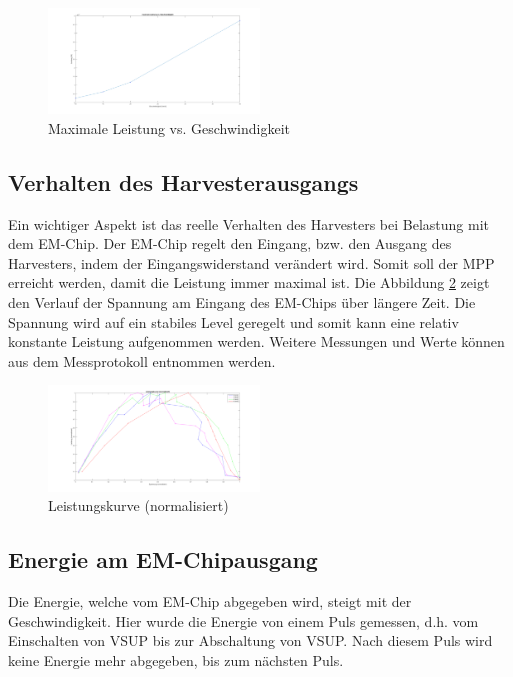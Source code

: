 \begin{figure}[ht]
    \includegraphics[width=0.5\textwidth]{4Resultate/imag/ResultatLeistungGeschwindigkeit.png} 
    \caption{Maximale Leistung vs. Geschwindigkeit}
    \label{mpp_resultat_harvester}
\end{figure}

\subsection{Verhalten des Harvesterausgangs}
Ein wichtiger Aspekt ist das reelle Verhalten des Harvesters bei Belastung mit dem EM-Chip. Der EM-Chip regelt den Eingang, bzw. den Ausgang des Harvesters, indem der Eingangswiderstand verändert wird. Somit soll der MPP erreicht werden, damit die Leistung immer maximal ist. Die Abbildung \ref{resultat_Harvester_Spannung} zeigt den Verlauf der Spannung am Eingang des EM-Chips über längere Zeit. Die Spannung wird auf ein stabiles Level geregelt und somit kann eine relativ konstante Leistung aufgenommen werden. Weitere Messungen und Werte können aus dem Messprotokoll  entnommen werden.

\begin{figure}[ht]
    \includegraphics[width=0.5\textwidth]{4Resultate/imag/MPPHarvester.png} 
    \caption{Leistungskurve (normalisiert) }
    \label{resultat_Harvester_Spannung}
\end{figure}


\subsection{Energie am EM-Chipausgang}

Die Energie, welche vom EM-Chip abgegeben wird, steigt mit der Geschwindigkeit. Hier wurde die Energie von einem Puls gemessen, d.h. vom Einschalten von VSUP bis zur Abschaltung von VSUP. Nach diesem Puls wird keine Energie mehr abgegeben, bis zum nächsten Puls.

